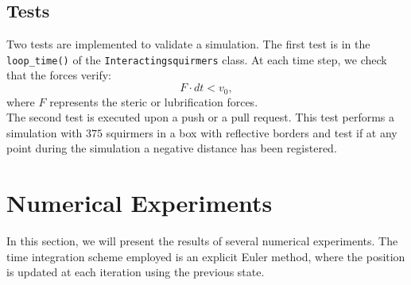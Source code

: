 \documentclass{article}
\begin{document}
\subsection*{Tests}
Two tests are implemented to validate a simulation. The first test is in the \texttt{loop\_time()} of the \texttt{Interactingsquirmers} class.
At each time step, we check that the forces verify:
$$F\cdot dt < v_0,$$
where $F$ represents the steric or lubrification forces.\\
The second test is executed upon a push or a pull request. This test performs a simulation with $375$ squirmers in a box
with reflective borders and test if at any point during the simulation a negative distance has been registered.

\newpage
\section{Numerical Experiments}
In this section, we will present the results of several numerical experiments. The time integration scheme employed 
is an explicit Euler method, where the position is updated at each iteration using the previous state. 
\end{document}
